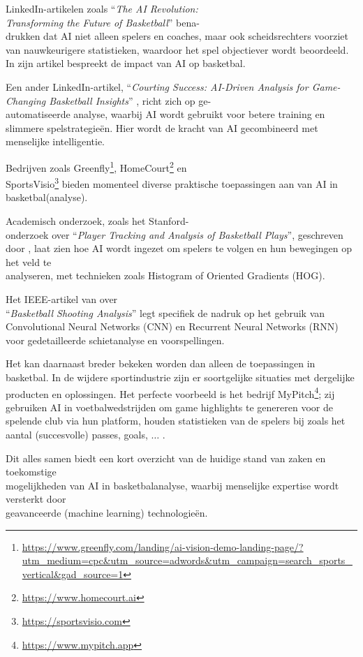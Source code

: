 LinkedIn-artikelen zoals ``\emph{The AI Revolution: \\Transforming the Future of Basketball}'' bena-\\drukken dat AI niet alleen spelers en coaches, maar ook scheidsrechters voorziet van nauwkeurigere statistieken, waardoor het spel objectiever wordt beoordeeld.
In zijn artikel bespreekt \textcite{R2} de impact van AI op basketbal.

Een ander LinkedIn-artikel, ``\emph{Courting Success: AI-Driven Analysis for Game-Changing Basketball Insights}'' \autocite{R3}, richt zich op ge-\\automatiseerde analyse, waarbij AI wordt gebruikt voor betere training en slimmere spelstrategieën. Hier wordt de kracht van AI gecombineerd met menselijke intelligentie.

Bedrijven zoals Greenfly\footnote{\url{https://www.greenfly.com/landing/ai-vision-demo-landing-page/?utm_medium=cpc&utm_source=adwords&utm_campaign=search_sports_vertical&gad_source=1}}, HomeCourt\footnote{\url{https://www.homecourt.ai}} en \\SportsVisio\footnote{\url{https://sportsvisio.com}} bieden momenteel diverse praktische toepassingen aan van AI in basketbal(analyse).

Academisch onderzoek, zoals het Stanford-\\onderzoek over ``\emph{Player Tracking and Analysis of Basketball Plays}'', geschreven door \textcite{R1}, laat zien hoe AI wordt ingezet om spelers te volgen en hun bewegingen op het veld te \\analyseren, met technieken zoals Histogram of Oriented Gradients (HOG).

Het IEEE-artikel van \textcite{R7} over \\``\emph{Basketball Shooting Analysis}'' legt specifiek de nadruk op het gebruik van Convolutional Neural Networks (CNN) en Recurrent Neural Networks (RNN) voor gedetailleerde schietanalyse en voorspellingen.

Het kan daarnaast breder bekeken worden dan alleen de toepassingen in basketbal. In de wijdere sportindustrie zijn er soortgelijke situaties met dergelijke producten en oplossingen. Het perfecte voorbeeld is het bedrijf MyPitch\footnote{\url{https://www.mypitch.app}}; zij gebruiken AI in voetbalwedstrijden om game highlights te genereren voor de spelende club via hun platform, houden statistieken van de spelers bij zoals het aantal (succesvolle) passes, goals, $\ldots$ .

Dit alles samen biedt een kort overzicht van de huidige stand van zaken en toekomstige \\mogelijkheden van AI in basketbalanalyse, waarbij menselijke expertise wordt versterkt door \\geavanceerde (machine learning) technologieën.

